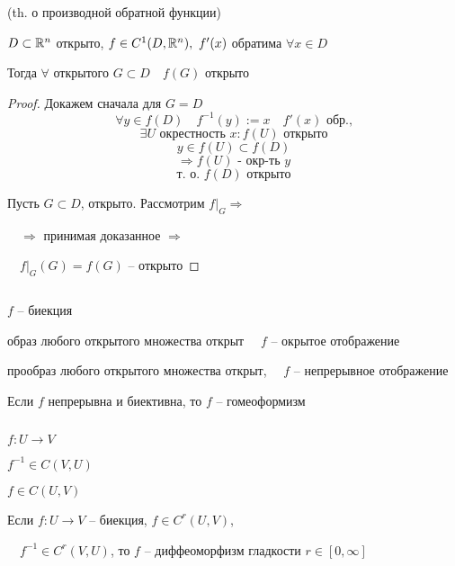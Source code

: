 



    
    \begin{corollary}
        (th. о производной обратной функции) \hfill {}
        \par $D \subset \mathbb{R}^n$ открыто, $f \in C^1(D, \mathbb{R}^n), \ f'(x)$ обратима $\forall x \in D$
        \par Тогда $\forall$ открытого $G \subset D \quad f(G)$ открыто
    \end{corollary}
    \begin{proof}
        Докажем сначала для $G = D$
        \[ \forall y \in f(D) \quad f^{-1}(y) := x \quad f'(x) \text{ обр.,} \]
        \[ \exists U \text{ окрестность } x : f(U) \text{ открыто} \]
        \[ y \in f(U) \subset f(D) \]
        \[ \Rightarrow f(U) \text{ - окр-ть } y \]
        \[\text{т. о. } f(D) \text{ открыто}\]
        \par Пусть $G \subset D$, открыто. Рассмотрим $f\big|_G \Rightarrow$
        \par $\quad \Rightarrow$ принимая доказанное $\Rightarrow$
        \par $\quad f\big|_G(G) = f(G)$ -- открыто
    \end{proof}

    $ $
    \linebreak
    \par $f$ -- биекция
    \par образ любого открытого множества открыт $\quad f$ -- окрытое отображение
    \par прообраз любого открытого множества открыт, $\quad f$ -- непрерывное отображение

    \begin{definition}
        Если $f$ непрерывна и биективна, то $f$ -- гомеоформизм
    \end{definition}

    $ $
    \par $f : U \rightarrow V$
    \par $f^{-1} \in C(V, U)$
    \par $f \in C(U, V)$

    \begin{definition}
        Если $f : U \rightarrow V$ -- биекция, $f \in C^r(U, V)$,
        \par $\quad f^{-1} \in C^r(V, U)$, то $f$ -- диффеоморфизм гладкости $r \in [0, \infty]$
    \end{definition}


